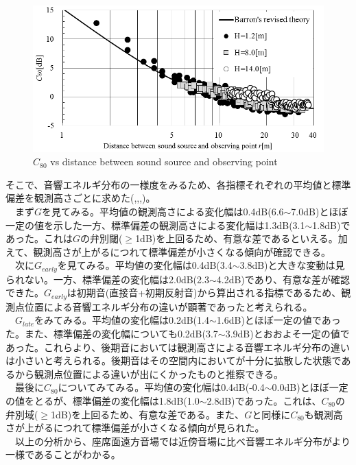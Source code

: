 \begin{figure}[htbp]
    \centering
    \includegraphics[keepaspectratio,scale=1]{04_att/C_Barron.png}
    \caption{\hspace{1mm}$C_{80}$ vs distance between sound source and observing point}
    \label{fig:C_Barron}
\end{figure}

そこで、音響エネルギ分布の一様度をみるため、各指標それぞれの平均値と標準偏差を観測高さごとに求めた(,,,)。
\\　まず$G$を見てみる。平均値の観測高さによる変化幅は0.4dB(6.6$\sim$7.0dB)とほぼ一定の値を示した一方、標準偏差の観測高さによる変化幅は1.3dB(3.1$\sim$1.8dB)であった。これは$G$の弁別閾($\geq$1dB)を上回るため、有意な差であるといえる。加えて、観測高さが上がるにつれて標準偏差が小さくなる傾向が確認できる。
\\　次に$G_{early}$を見てみる。平均値の変化幅は0.4dB(3.4$\sim$3.8dB)と大きな変動は見られない。一方、標準偏差の変化幅は2.0dB(2.3$\sim$4.2dB)であり、有意な差が確認できた。$G_{early}$は初期音(直接音+初期反射音)から算出される指標であるため、観測点位置による音響エネルギ分布の違いが顕著であったと考えられる。
\\　$G_{late}$をみてみる。平均値の変化幅は0.2dB(1.4$\sim$1.6dB)とほぼ一定の値であった。また、標準偏差の変化幅についても0.2dB(3.7$\sim$3.9dB)とおおよそ一定の値であった。これらより、後期音においては観測高さによる音響エネルギ分布の違いは小さいと考えられる。後期音はその空間内においてが十分に拡散した状態であるから観測点位置による違いが出にくかったものと推察できる。
\\　最後に$C_{80}$についてみてみる。平均値の変化幅は0.4dB(-0.4$\sim$0.0dB)とほぼ一定の値をとるが、標準偏差の変化幅は1.8dB(1.0$\sim$2.8dB)であった。これは、$C_{80}$の弁別域($\geq$1dB)を上回るため、有意な差である。また、$G$と同様に$C_{80}$も観測高さが上がるにつれて標準偏差が小さくなる傾向が見られた。
\\　以上の分析から、座席面遠方音場では近傍音場に比べ音響エネルギ分布がより一様であることがわかる。
